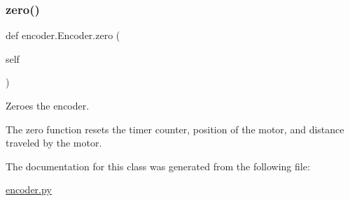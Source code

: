 \subsubsection{\texorpdfstring{zero()}{zero()}}
{\footnotesize\ttfamily def encoder.\+Encoder.\+zero (\begin{DoxyParamCaption}\item[{}]{self }\end{DoxyParamCaption})}



Zeroes the encoder. 

The zero function resets the timer counter, position of the motor, and distance traveled by the motor. 

The documentation for this class was generated from the following file\+:\begin{DoxyCompactItemize}
\item 
\mbox{\hyperlink{encoder_8py}{encoder.\+py}}\end{DoxyCompactItemize}
